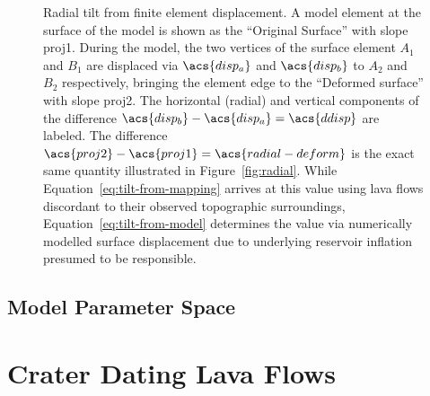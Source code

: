 \begin{figure}
    
    \caption[Calculation of \acf{radial-deform} from modelling]{Radial tilt from finite element displacement. A model element at the surface of the model is shown as the ``Original Surface'' with slope \acs{proj1}. During the model, the two vertices of the surface element $A_1$ and $B_1$ are displaced via $\acs{disp_a}$ and $\acs{disp_b}$ to $A_2$ and $B_2$ respectively, bringing the element edge to the ``Deformed surface'' with slope \acs{proj2}. The horizontal (radial) and vertical components of the difference $\acs{disp_b} - \acs{disp_a} = \acs{ddisp}$ are labeled. The difference $\acs{proj2}-\acs{proj1}=\acs{radial-deform}$ is the exact same quantity illustrated in Figure~\ref{fig:radial}. While Equation~\eqref{eq:tilt-from-mapping} arrives at this value using lava flows discordant to their observed topographic surroundings, Equation~\eqref{eq:tilt-from-model} determines the value via numerically modelled surface displacement due to underlying reservoir inflation presumed to be responsible.}
    \label{fig:tilt-from-model}
\end{figure}

\subsection{Model Parameter Space}

\section{Crater Dating Lava Flows}

